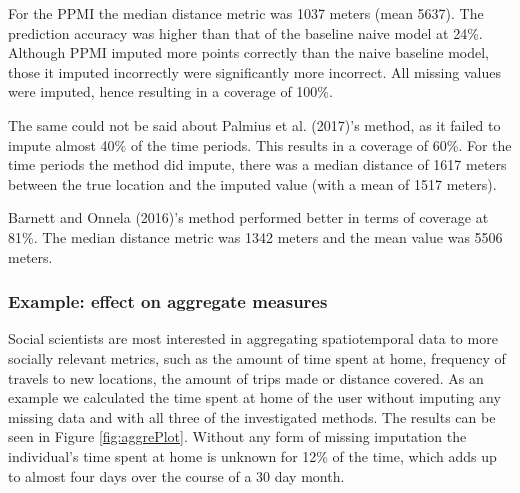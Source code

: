 \documentclass[man]{apa6}
\theoremstyle{definition}
\theoremstyle{definition}
\theoremstyle{definition}
\theoremstyle{remark}
\begin{document}
For the PPMI the median distance metric was 1037 meters (mean 5637). The
prediction accuracy was higher than that of the baseline naive model at
24\%. Although PPMI imputed more points correctly than the naive
baseline model, those it imputed incorrectly were significantly more
incorrect. All missing values were imputed, hence resulting in a
coverage of 100\%.

The same could not be said about Palmius et al. (2017)'s method, as it
failed to impute almost 40\% of the time periods. This results in a
coverage of 60\%. For the time periods the method did impute, there was
a median distance of 1617 meters between the true location and the
imputed value (with a mean of 1517 meters).

Barnett and Onnela (2016)'s method performed better in terms of coverage
at 81\%. The median distance metric was 1342 meters and the mean value
was 5506 meters.

\subsubsection{Example: effect on aggregate
measures}\label{example-effect-on-aggregate-measures}

Social scientists are most interested in aggregating spatiotemporal data
to more socially relevant metrics, such as the amount of time spent at
home, frequency of travels to new locations, the amount of trips made or
distance covered. As an example we calculated the time spent at home of
the user without imputing any missing data and with all three of the
investigated methods. The results can be seen in Figure
\ref{fig:aggrePlot}. Without any form of missing imputation the
individual's time spent at home is unknown for 12\% of the time, which
adds up to almost four days over the course of a 30 day month.
\end{document}
